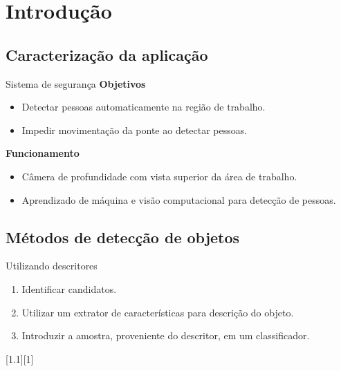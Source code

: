 \section{Introdução}

\subsection{Caracterização da aplicação}
	\begin{frame}{\insertsubsection}
	\end{frame}

	\begin{frame}{\insertsubsection}
	\end{frame}

	\begin{frame}{\insertsubsection}
	\end{frame}

	\begin{frame}{Sistema de segurança}
		\textbf{Objetivos} \\
		\begin{itemize}
			\item Detectar pessoas automaticamente na região de trabalho.
			\item Impedir movimentação da ponte ao detectar pessoas.
		\end{itemize}

		\pause

		\textbf{Funcionamento} \\
		\begin{itemize}
			\item Câmera de profundidade com vista superior da área de trabalho.
			\item Aprendizado de máquina e visão computacional para detecção de pessoas.
		\end{itemize}
	\end{frame}


\subsection{Métodos de detecção de objetos}
	\begin{frame}{Utilizando descritores}
	\begin{enumerate}
	\item Identificar candidatos.
	\item Utilizar um extrator de características para descrição do objeto.
	\item Introduzir a amostra, proveniente do descritor, em um classificador.
	\end{enumerate}

	[1.1][1]
	\end{frame}

